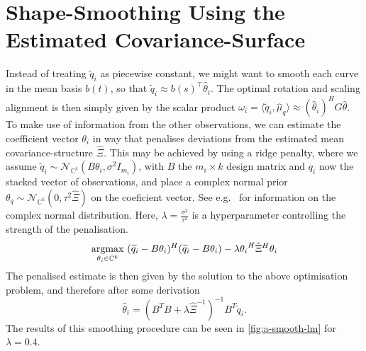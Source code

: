 \section{Shape-Smoothing Using the Estimated Covariance-Surface}
\label{app:a-smooth}
Instead of treating $\widetilde q_i$ as piecewise constant, we might want to smooth each curve in the mean basis $b(t)$, so that $\widetilde q_i \approx b(s)^\top \hat\theta_i$.
The optimal rotation and scaling alignment is then simply given by the scalar product 
$ \omega_i = \langle \widetilde q_i, \hat\mu_q \rangle \approx (\hat\theta_i)^H G \hat\theta$.
To make use of information from the other observations, we can estimate the coefficient vector $\theta_i$ in way that penalises deviations from the estimated mean covariance-structure $\hat\Xi$.
This may be achieved by using a ridge penalty, where we assume $\widetilde q_i \sim \mathcal{N}_{\mathbb{C}^k}(B \theta_i, \sigma^2 I_{m_i})$, with $B$ the $m_i \times k$ design matrix and $q_i$ now the stacked vector of observations, and place a complex normal prior $\theta_q \sim \mathcal{N}_{\mathbb{C}^k}(0, \tau^2 \hat\Xi)$ on the coeficient vector.
See e.g.\ \parencite{Picinbono1996} for information on the complex normal distribution.
Here, $\lambda = \frac{\sigma^2}{\tau^2}$ is a hyperparameter controlling the strength of the penalisation.
\begin{equation}
  \operatorname*{argmax}_{\theta_i \in \mathbb{C}^k} \,\, (\widetilde q_i - B\theta_i)^H (\widetilde q_i - B \theta_i) - \lambda {\theta_i}^H {\hat\Xi}^H \theta_i
\end{equation}
The penalised estimate is then given by the solution to the above optimisation problem, and therefore after some derivation
\begin{equation}
  \hat\theta_i = (B^T B + \lambda {\hat\Xi}^{-1})^{-1} B^T \widetilde q_i.
\end{equation}
The results of this smoothing procedure can be seen in \cref{fig:a-smooth-lm} for $\lambda = 0.4$.
